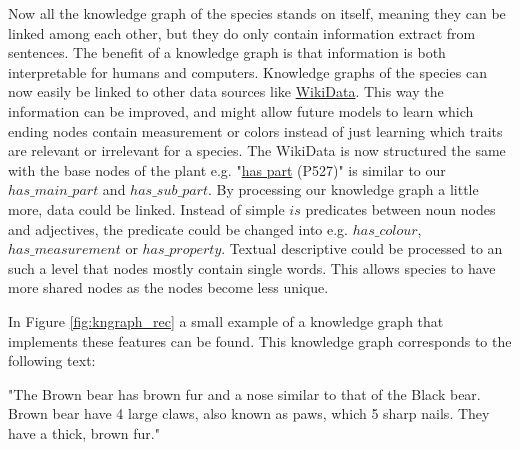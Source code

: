 \documentclass[a4paper, 12pt, oneside]{book} %
\begin{document}
Now all the knowledge graph of the species stands on itself, meaning they can be linked among each other, but they do only contain information extract from sentences.
The benefit of a knowledge graph is that information is both interpretable for humans and computers.
Knowledge graphs of the species can now easily be linked to other data sources like \href{https://www.wikidata.org/wiki/Wikidata:Main_Page}{WikiData}.
This way the information can be improved, and might allow future models to learn which ending nodes contain measurement or colors instead of just learning which traits are relevant or irrelevant for a species.
The WikiData is now structured the same with the base nodes of the plant e.g. "\href{https://www.wikidata.org/wiki/Property:P527}{has part} (P527)"  is similar to our $has\_main\_part$ and $has\_sub\_part$.
By processing our knowledge graph a little more, data could be linked.
Instead of simple $is$ predicates between noun nodes and adjectives, the predicate could be changed into e.g. $has\_colour$, $has\_measurement$ or $has\_property$.
Textual descriptive could be processed to an such a level that nodes mostly contain single words.
This allows species to have more shared nodes as the nodes become less unique.

In Figure \ref{fig:kngraph_rec} a small example of a knowledge graph that implements these features can be found.
This knowledge graph corresponds to the following text:
\newline

\noindent
"The Brown bear has brown fur and a nose similar to that of the Black bear. Brown bear have 4 large claws, also known as paws, which 5 sharp nails. They have a thick, brown fur."
\end{document}
